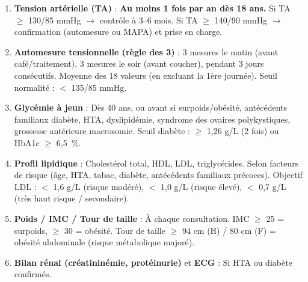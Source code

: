 \documentclass[11pt]{article}
\begin{document}
\begin{methode}
\begin{enumerate}
\item \textbf{Tension artérielle (TA)} : \textbf{Au moins 1 fois par an dès 18 ans.} Si TA $\ge$ 130/85 mmHg $\rightarrow$ contrôle à 3--6 mois. Si TA $\ge$ 140/90 mmHg $\rightarrow$ confirmation (automesure ou MAPA) et prise en charge.
\item \textbf{Automesure tensionnelle (règle des 3)} : 3 mesures le matin (avant café/traitement), 3 mesures le soir (avant coucher), pendant 3 jours consécutifs. Moyenne des 18 valeurs (en excluant la 1ère journée). Seuil normalité : $<$ 135/85 mmHg.
\item \textbf{Glycémie à jeun} : Dès 40 ans, ou avant si surpoids/obésité, antécédents familiaux diabète, HTA, dyslipidémie, syndrome des ovaires polykystiques, grossesse antérieure macrosomie. Seuil diabète : $\ge$ 1,26 g/L (2 fois) ou HbA1c $\ge$ 6,5~\%.
\item \textbf{Profil lipidique} : Cholestérol total, HDL, LDL, triglycérides. Selon facteurs de risque (âge, HTA, tabac, diabète, antécédents familiaux précoces). Objectif LDL : $<$ 1,6 g/L (risque modéré), $<$ 1,0 g/L (risque élevé), $<$ 0,7 g/L (très haut risque / secondaire).
\item \textbf{Poids / IMC / Tour de taille} : À chaque consultation. IMC $\ge$ 25 = surpoids, $\ge$ 30 = obésité. Tour de taille $\ge$ 94 cm (H) / 80 cm (F) = obésité abdominale (risque métabolique majoré).
\item \textbf{Bilan rénal (créatininémie, protéinurie)} et \textbf{ECG} : Si HTA ou diabète confirmés.
\end{enumerate}
\end{methode}
\end{document}
